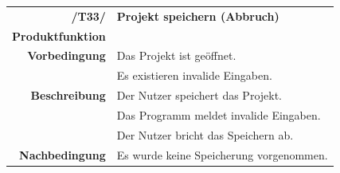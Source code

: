 \documentclass{article}
\begin{document}
\begin{table}[H]
\begin{tabularx}{\textwidth}{rX}
 \vspace{1mm}
\textbf{/T33/}         & \textbf{Projekt speichern (Abbruch)} \\ \vspace{1mm}
\textbf{Produktfunktion} & \nameref{sec:f:Projekt speichern} \\
\textbf{Vorbedingung}  & Das Projekt ist geöffnet.   \\ \vspace{1mm} & Es existieren invalide Eingaben. \\
\textbf{Beschreibung}  & Der Nutzer speichert das Projekt. \\ & Das Programm meldet invalide Eingaben. \\ \vspace{1mm} & Der Nutzer bricht das Speichern ab. \\
\textbf{Nachbedingung} & Es wurde keine Speicherung vorgenommen.  
\end{tabularx}
\end{table}
\end{document}
